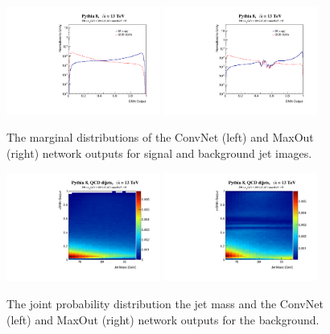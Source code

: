 \documentclass{article}
\begin{document}
\begin{figure}[htbp!]
  \begin{center}
        \includegraphics[width=0.45\textwidth]{figures/convnet.pdf} \includegraphics[width=0.45\textwidth]{figures/maxout.pdf}
      \caption{ The marginal distributions of the ConvNet (left) and MaxOut (right) network outputs for signal and background jet images.
      \label{fig:marginal_DNN} }
    \end{center}
\end{figure}

\begin{figure}[htbp!]
  \begin{center}
        \includegraphics[width=0.45\textwidth]{figures/mass_convnet_back.pdf} \includegraphics[width=0.45\textwidth]{figures/mass_maxout_back.pdf}
      \caption{ The joint probability distribution the jet mass and the ConvNet (left) and MaxOut (right) network outputs for the background. 
      \label{fig:mass_DNN} }
    \end{center}
\end{figure}
\end{document}
